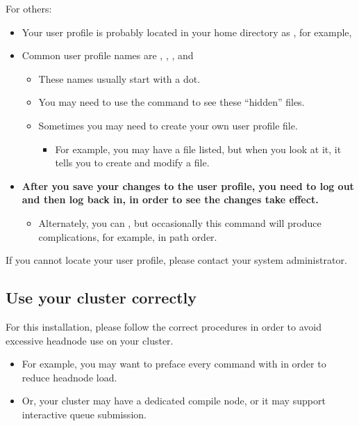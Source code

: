 \documentclass[letterpaper,10pt,english]{sphinxmanual}
\begin{document}
For others:
\begin{itemize}
\item {} 
Your user profile is probably located in your home directory as , for example, 

\item {} 
Common user profile names are , , , and 
\begin{itemize}
\item {} 
These names usually start with a dot.

\item {} 
You may need to use the command  to see these ``hidden'' files.

\item {} 
Sometimes you may need to create your own user profile file.
\begin{itemize}
\item {} 
For example, you may have a  file listed, but when you look at it, it tells you to create and modify a  file.

\end{itemize}

\end{itemize}

\item {} 
\textbf{After you save your changes to the user profile, you need to log out and then log back in, in order to see the changes take effect.}
\begin{itemize}
\item {} 
Alternately, you can , but occasionally this command will produce complications, for example, in path order.

\end{itemize}

\end{itemize}

If you cannot locate your user profile, please contact your system administrator.


\subsection{Use your cluster correctly}
\label{1_0_installation:use-your-cluster-correctly}\label{1_0_installation:use-cluster-correctly}
For this installation, please follow the correct procedures in order to avoid excessive headnode use on your cluster.
\begin{itemize}
\item {} 
For example, you may want to preface every command with  in order to reduce headnode load.

\item {} 
Or, your cluster may have a dedicated compile node, or it may support interactive queue submission.

\end{itemize}
\end{document}
